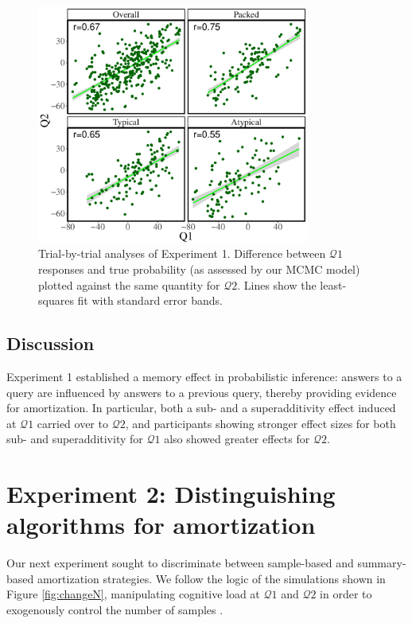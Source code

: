 \begin{figure}
\centering
\includegraphics[width=0.8\textwidth]{figures/exp1correspondence.pdf}
\caption{Trial-by-trial analyses of Experiment 1. Difference between $\mathcal{Q}1$ responses and true probability (as assessed by our MCMC model) plotted against the same quantity for $\mathcal{Q}2$. Lines show the least-squares fit with standard error bands.}
\label{fig:correspondence1}
\end{figure}

\subsection{Discussion}

Experiment 1 established a memory effect in probabilistic inference: answers to a query are influenced by answers to a previous query, thereby providing evidence for amortization. In particular, both a sub- and a superadditivity effect induced at $\mathcal{Q}1$ carried over to $\mathcal{Q}2$, and participants showing stronger effect sizes for both sub- and superadditivity for $\mathcal{Q}1$ also showed greater effects for $\mathcal{Q}2$. 

\section{Experiment 2: Distinguishing algorithms for amortization}

Our next experiment sought to discriminate between sample-based and summary-based amortization strategies. We follow the logic of the simulations shown in Figure \ref{fig:changeN}, manipulating cognitive load at $\mathcal{Q}1$ and $\mathcal{Q}2$ in order to exogenously control the number of samples \citep[see][for a similar approach]{thaker17,dasgupta17}. 

